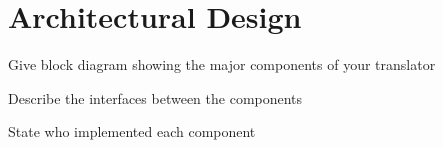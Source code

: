 \chapter{Architectural Design}

Give block diagram showing the major components of your translator

Describe the interfaces between the components

State who implemented each component
